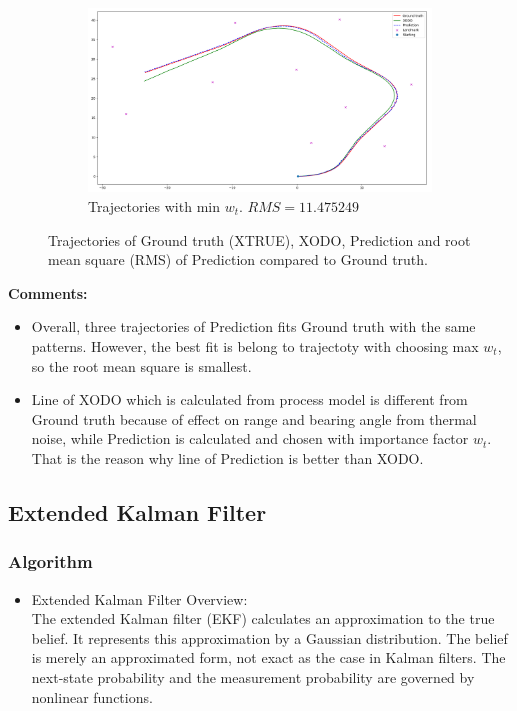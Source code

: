 \documentclass{article}
\begin{document}
\begin{figure}[h!]
\begin{subfigure}[b]{0.8\linewidth}
	\includegraphics[width=\textwidth]{min.png}
	\caption{Trajectories with min $w_t$. $RMS = 11.475249$}\label{fig:image-3}
\end{subfigure}
\caption{Trajectories of Ground truth (XTRUE), XODO, Prediction and root mean square (RMS) of Prediction compared to Ground truth.}
\end{figure}


\textbf{Comments:}

\begin{itemize}
	\item{Overall, three trajectories of Prediction fits Ground truth with the same patterns. However, the best fit is belong to trajectoty with choosing max $w_t$, so the root mean square is smallest.} 
	\item{Line of XODO which is calculated from process model is different from Ground truth because of effect on range and bearing angle from thermal noise, while Prediction is calculated and chosen with importance factor $w_t$. That is the reason why line of Prediction is better than XODO.}
\end{itemize}


\pagebreak

\subsection{Extended Kalman Filter}
\subsubsection{Algorithm}
\begin{itemize}
	\item{Extended Kalman Filter Overview: }	\\
The extended Kalman filter (EKF) calculates an approximation to the true belief. It
represents this approximation by a Gaussian distribution. The belief is merely an approximated form, not exact as the case in Kalman filters. The next-state probability and the measurement probability are governed by nonlinear functions.
\end{itemize}
\end{document}
